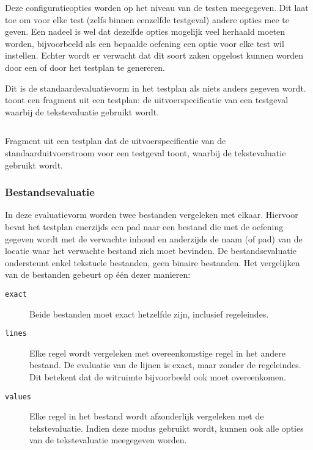 Deze configuratieopties worden op het niveau van de testen meegegeven.
Dit laat toe om voor elke test (zelfs binnen eenzelfde testgeval) andere opties mee te geven.
Een nadeel is wel dat dezelfde opties mogelijk veel herhaald moeten worden, bijvoorbeeld als een bepaalde oefening een optie voor elke test wil instellen.
Echter wordt er verwacht dat dit soort zaken opgelost kunnen worden door een  of door het testplan te genereren.

Dit is de standaardevaluatievorm in het testplan als niets anders gegeven wordt.
 toont een fragment uit een testplan: de uitvoerspecificatie van een testgeval waarbij de tekstevaluatie gebruikt wordt.

\begin{listing}
    \inputminted{json}{code/testplan-text.json}
    \caption{Fragment uit een testplan dat de uitvoerspecificatie van de standaarduitvoerstroom voor een testgeval toont, waarbij de tekstevaluatie gebruikt wordt.}
    \label{lst:testplan-text}
\end{listing}

\subsubsection{Bestandsevaluatie}

In deze evaluatievorm worden twee bestanden vergeleken met elkaar.
Hiervoor bevat het testplan enerzijds een pad naar een bestand die met de oefening gegeven wordt met de verwachte inhoud en anderzijds de naam (of pad) van de locatie waar het verwachte bestand zich moet bevinden.
De bestandsevaluatie ondersteunt enkel tekstuele bestanden, geen binaire bestanden.
Het vergelijken van de bestanden gebeurt op één dezer manieren:

\begin{description}
    \item[\texttt{exact}] Beide bestanden moet exact hetzelfde zijn, inclusief regeleindes.
    \item[\texttt{lines}] Elke regel wordt vergeleken met overeenkomstige regel in het andere bestand.
    De evaluatie van de lijnen is exact, maar zonder de regeleindes.
    Dit betekent dat de witruimte bijvoorbeeld ook moet overeenkomen.
    \item[\texttt{values}] Elke regel in het bestand wordt afzonderlijk vergeleken met de tekstevaluatie.
    Indien deze modus gebruikt wordt, kunnen ook alle opties van de tekstevaluatie meegegeven worden.
\end{description}

